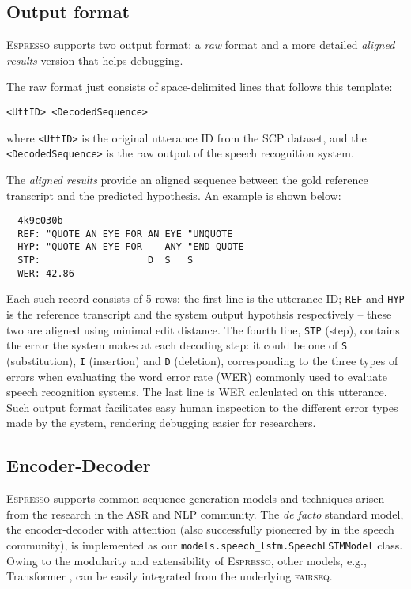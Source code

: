 \documentclass{article}
\def\espresso{\textsc{Espresso}\xspace}
\def\fairseq{\textsc{fairseq}\xspace}
\begin{document}
\subsection{Output format}
\espresso supports two output format: a \emph{raw} format and a more detailed \emph{aligned results} version that helps debugging. 

The raw format just consists of space-delimited lines that follows this template:
\begin{displayquote}
  \verb|<UttID> <DecodedSequence>|
\end{displayquote}
\noindent where \texttt{<UttID>} is the original utterance ID from the SCP dataset, and the \texttt{<DecodedSequence>} is the raw output of the speech recognition system. 

The \emph{aligned results} provide an aligned sequence between the gold reference transcript and the predicted hypothesis. An example is shown below:

{\small{
\begin{verbatim}
  4k9c030b
  REF: "QUOTE AN EYE FOR AN EYE "UNQUOTE
  HYP: "QUOTE AN EYE FOR    ANY "END-QUOTE
  STP:                   D  S   S
  WER: 42.86\end{verbatim}
}}

Each such record consists of 5 rows: the first line is the utterance ID; \texttt{REF} and \texttt{HYP} is the reference transcript and the system output hypothsis respectively -- these two are aligned using minimal edit distance. The fourth line, \texttt{STP} (step), contains the error the system makes at each decoding step: it could be one of \texttt{S} (substitution), \texttt{I} (insertion) and \texttt{D} (deletion), corresponding to the three types of errors when evaluating the word error rate (WER) commonly used to evaluate speech recognition systems. The last line is WER calculated on this utterance. Such output format facilitates easy human inspection to the different error types made by the system, rendering debugging easier for researchers.

\subsection{Encoder-Decoder}
\espresso supports common sequence generation models and techniques arisen from the research in the ASR and NLP community. The \emph{de facto} standard model, the encoder-decoder with attention \cite{bahdanau2015neural,luong2015effective} (also successfully pioneered by \cite{chorowski2014end} in the speech community), is implemented as our \texttt{models.speech\_lstm.SpeechLSTMModel} class. Owing to the modularity and extensibility of \espresso, other models, e.g., Transformer \cite{vaswani2017attention}, can be easily integrated from the underlying \fairseq.
\end{document}
